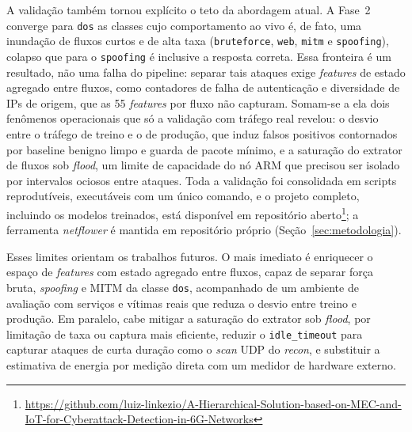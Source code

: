 \documentclass[12pt]{article}
\begin{document}
A validação também tornou explícito o teto da abordagem atual. A Fase~2 converge
para \texttt{dos} as classes cujo comportamento ao vivo é, de fato, uma
inundação de fluxos curtos e de alta taxa (\texttt{bruteforce}, \texttt{web},
\texttt{mitm} e \texttt{spoofing}), colapso que para o \texttt{spoofing} é
inclusive a resposta correta. Essa fronteira é um resultado, não uma falha do
pipeline: separar tais ataques exige \textit{features} de estado agregado entre
fluxos, como contadores de falha de autenticação e diversidade de IPs de origem,
que as 55 \textit{features} por fluxo não capturam. Somam-se a ela dois
fenômenos operacionais que só a validação com tráfego real revelou: o desvio
entre o tráfego de treino e o de produção, que induz falsos positivos
contornados por baseline benigno limpo e guarda de pacote mínimo, e a saturação
do extrator de fluxos sob \textit{flood}, um limite de capacidade do nó ARM que
precisou ser isolado por intervalos ociosos entre ataques. Toda a validação foi
consolidada em scripts reprodutíveis, executáveis com um único comando, e o
projeto completo, incluindo os modelos treinados, está disponível em repositório
aberto\footnote{\url{https://github.com/luiz-linkezio/A-Hierarchical-Solution-based-on-MEC-and-IoT-for-Cyberattack-Detection-in-6G-Networks}};
a ferramenta \textit{netflower} é mantida em repositório próprio
(Seção~\ref{sec:metodologia}).

Esses limites orientam os trabalhos futuros. O mais imediato é enriquecer o
espaço de \textit{features} com estado agregado entre fluxos, capaz de separar
força bruta, \textit{spoofing} e MITM da classe \texttt{dos}, acompanhado de um
ambiente de avaliação com serviços e vítimas reais que reduza o desvio entre
treino e produção. Em paralelo, cabe mitigar a saturação do extrator sob
\textit{flood}, por limitação de taxa ou captura mais eficiente, reduzir o
\texttt{idle\_timeout} para capturar ataques de curta duração como o \textit{scan}
UDP do \textit{recon}, e substituir a estimativa de energia por medição direta
com um medidor de hardware externo.



\end{document}
